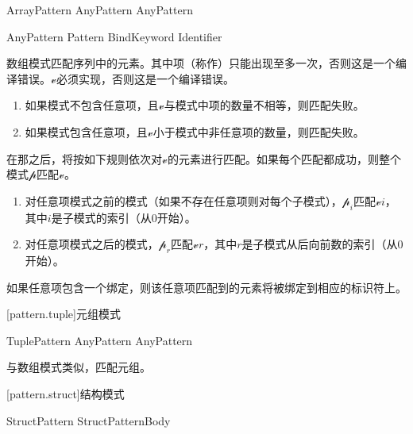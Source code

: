 \begin{bnf}{ArrayPattern}
    \terminal{[} AnyPattern \bnflp\terminal{,} AnyPattern\bnfrp\bnfs\ \terminal{]}
\end{bnf}

\begin{bnf}{AnyPattern}
    Pattern\br
     \br
    BindKeyword  Identifier
\end{bnf}

\pnum
数组模式匹配序列中的元素。其中项（称作）只能出现至多一次，否则这是一个编译错误。$\mathcal{v}$必须实现，否则这是一个编译错误。

\begin{enumerate}
    \item 如果模式不包含任意项，且$\mathcal{v}$与模式中项的数量不相等，则匹配失败。
    \item 如果模式包含任意项，且$\mathcal{v}$小于模式中非任意项的数量，则匹配失败。
\end{enumerate}

\pnum
在那之后，将按如下规则依次对$\mathcal{v}$的元素进行匹配。如果每个匹配都成功，则整个模式$\mathcal{p}$匹配$\mathcal{v}$。

\begin{enumerate}
    \item 对任意项模式之前的模式（如果不存在任意项则对每个子模式），$\mathcal{p}_i$匹配$\mathcal{v}$\tcode{[}$i$\tcode{]}，其中$i$是子模式的索引（从0开始）。
    \item 对任意项模式之后的模式，$\mathcal{p}_r$匹配$\mathcal{v}$\tcode{[\$-}$r$\tcode{]}，其中$r$是子模式从后向前数的索引（从0开始）。
\end{enumerate}

\pnum
如果任意项包含一个绑定，则该任意项匹配到的元素将被绑定到相应的标识符上。

[pattern.tuple]{元组模式}

\begin{bnf}{TuplePattern}
    \terminal{(} AnyPattern \bnflp\terminal{,} AnyPattern\bnfrp\bnfs\ \terminal{)}
\end{bnf}

\pnum
与数组模式类似，匹配元组。

[pattern.struct]{结构模式}

\begin{bnf}{StructPattern}
    \terminal{\{} StructPatternBody \terminal{\}}
\end{bnf}

